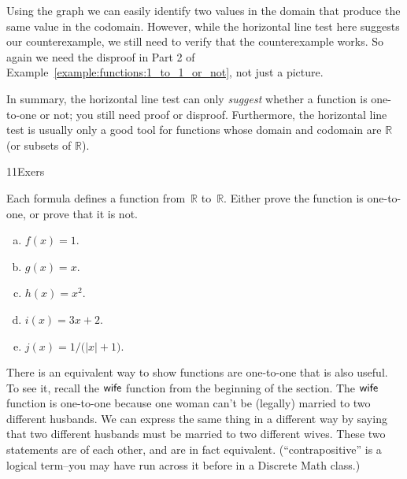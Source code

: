 \begin{rem}
Using the graph we can easily identify two values in the domain that produce the same value in the codomain.  However, while the horizontal line test here suggests our counterexample, we still need to verify that the counterexample works.  So again we need the disproof in Part 2 of Example~\ref{example:functions:1_to_1_or_not}, not just a picture.

In summary, the horizontal line test can only \emph{suggest} whether a function is one-to-one or not; you still need proof or disproof.  Furthermore, the horizontal line test is usually only a good tool for functions whose domain and codomain are ${\mathbb R}$ (or subsets of ${\mathbb R}$).
\end{rem}    


\begin{exercise}{11Exers}

 Each formula defines a function from~$\mathbb{R}$ to~$\mathbb{R}$. Either prove the function is one-to-one, or prove that it is not.
\begin{multicols}{2}
 \begin{enumerate}[(a)]
\item \label{11Exers-formula-f}
$f(x) = 1$.
\item \label{11Exers-formula-g}
$g(x) = x$.
\item \label{11Exers-formula-h}
$h(x) = x^2$.
\item \label{11Exers-formula-i}
$i(x) = 3x + 2$.
\item \label{11Exers-formula-j}
$j(x) = 1/ \bigl( |x| + 1 \bigr)$.
\end{enumerate}
\end{multicols}
\end{exercise}



There is an equivalent way to show functions are one-to-one that is also useful.  To see it, recall the $\sf{wife}$ function from the beginning of the section.  The $\sf{wife}$ function is one-to-one because one woman can't be (legally) married to two different husbands. We can express the same thing in a different way by saying that two different husbands must be married to two different wives. These two statements are  of each other, and are in fact equivalent.  (``contrapositive'' is a logical term--you may have run across it before in a Discrete Math class.)
 
